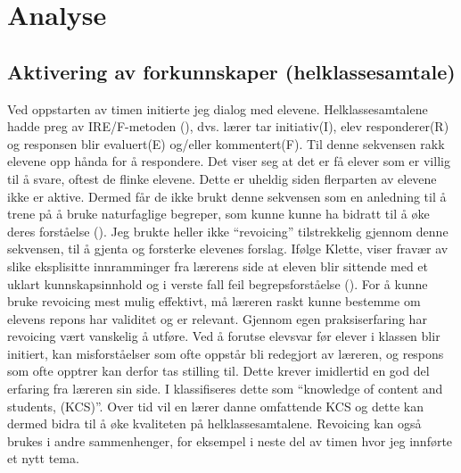 \documentclass[main.tex]{subfiles}
\begin{document}
\section*{Analyse}
\label{sec:2}

\subsection*{Aktivering av forkunnskaper (helklassesamtale)}
Ved oppstarten av timen initierte jeg dialog med elevene. Helklassesamtalene hadde preg av
IRE/F-metoden (), dvs. lærer tar initiativ(I), elev responderer(R) og responsen blir 
evaluert(E) og/eller kommentert(F). Til denne sekvensen rakk elevene opp hånda for å respondere. 
Det viser seg at det er få elever som er villig til å svare, oftest de flinke elevene. Dette 
er uheldig siden flerparten av elevene ikke er aktive. Dermed får de ikke brukt denne sekvensen som
en anledning til å trene på å bruke naturfaglige begreper, som kunne kunne ha bidratt til å øke deres 
forståelse ().
\newline
\newline
Jeg brukte heller ikke ``revoicing'' tilstrekkelig gjennom denne sekvensen, til å gjenta og 
forsterke elevenes forslag. Ifølge Klette, viser fravær av slike eksplisitte 
innramminger fra lærerens side at eleven blir sittende med et uklart kunnskapsinnhold og i 
verste fall feil begrepsforståelse (). For å kunne bruke revoicing 
mest mulig effektivt, må læreren raskt kunne bestemme om elevens repons har validitet 
og er relevant. Gjennom egen praksiserfaring har revoicing vært vanskelig å utføre.
Ved å forutse elevsvar før elever i klassen blir initiert, kan misforståelser som ofte oppstår bli 
redegjort av læreren, og respons som ofte opptrer kan derfor tas stilling til. Dette krever imidlertid 
en god del erfaring fra læreren sin side. I  klassifiseres dette som 
``knowledge of content and students, (KCS)''. Over tid vil en lærer danne omfattende KCS og
dette kan dermed bidra til å øke kvaliteten på helklassesamtalene. Revoicing kan også brukes
i andre sammenhenger, for eksempel i neste del av timen hvor jeg innførte et nytt tema. 
\end{document}
